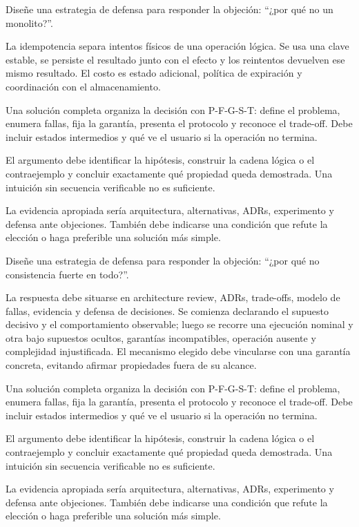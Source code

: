 \documentclass[variant=guia,cover=institutional,mode=screen]{ua-engineering-v6-article}
\begin{document}
\begin{uaexercise}
Diseñe una estrategia de defensa para responder la objeción: “¿por qué no un monolito?”.
\end{uaexercise}
\begin{uaanswer}
La idempotencia separa intentos físicos de una operación lógica. Se usa una clave estable, se persiste el resultado junto con el efecto y los reintentos devuelven ese mismo resultado. El costo es estado adicional, política de expiración y coordinación con el almacenamiento.

Una solución completa organiza la decisión con P-F-G-S-T: define el problema, enumera fallas, fija la garantía, presenta el protocolo y reconoce el trade-off. Debe incluir estados intermedios y qué ve el usuario si la operación no termina.

El argumento debe identificar la hipótesis, construir la cadena lógica o el contraejemplo y concluir exactamente qué propiedad queda demostrada. Una intuición sin secuencia verificable no es suficiente.

La evidencia apropiada sería arquitectura, alternativas, ADRs, experimento y defensa ante objeciones. También debe indicarse una condición que refute la elección o haga preferible una solución más simple.
\end{uaanswer}

\begin{uaexercise}
Diseñe una estrategia de defensa para responder la objeción: “¿por qué no consistencia fuerte en todo?”.
\end{uaexercise}
\begin{uaanswer}
La respuesta debe situarse en architecture review, ADRs, trade-offs, modelo de fallas, evidencia y defensa de decisiones. Se comienza declarando el supuesto decisivo y el comportamiento observable; luego se recorre una ejecución nominal y otra bajo supuestos ocultos, garantías incompatibles, operación ausente y complejidad injustificada. El mecanismo elegido debe vincularse con una garantía concreta, evitando afirmar propiedades fuera de su alcance.

Una solución completa organiza la decisión con P-F-G-S-T: define el problema, enumera fallas, fija la garantía, presenta el protocolo y reconoce el trade-off. Debe incluir estados intermedios y qué ve el usuario si la operación no termina.

El argumento debe identificar la hipótesis, construir la cadena lógica o el contraejemplo y concluir exactamente qué propiedad queda demostrada. Una intuición sin secuencia verificable no es suficiente.

La evidencia apropiada sería arquitectura, alternativas, ADRs, experimento y defensa ante objeciones. También debe indicarse una condición que refute la elección o haga preferible una solución más simple.
\end{uaanswer}
\end{document}
